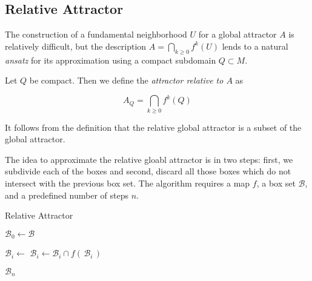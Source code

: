 
\subsection{Relative Attractor}

The construction of a fundamental neighborhood $U$ for a global attractor $A$ is
relatively difficult, but the description $A = \bigcap_{k \geq 0} f^k(U)$ lends to 
a natural \emph{ansatz} for its approximation using a compact subdomain $Q \subset M$. \\

\begin{definition}
    Let $Q$ be compact. Then we define the \emph{attractor relative to $A$} as

    \begin{equation}
        A_Q = \bigcap\limits_{k \geq 0} f^k (Q)
    \end{equation}

\end{definition}

\begin{remark}
    It follows from the definition that the relative global attractor is a subset of the 
    global attractor.\\
\end{remark}

The idea to approximate the relative gloabl attractor is in two steps: first, we subdivide 
each of the boxes and second, discard all those boxes which do not intersect with the 
previous box set. The algorithm requires a map $f$, a box set $\mathcal{B}$, and a 
predefined number of steps $n$. 

\begin{algorithm}
    \caption{Relative Attractor}
    \label{alg:relativeattractor}
    \begin{algorithmic}[1]
        \State $\mathcal{B}_0 \gets \mathcal{B}$

            \State $\mathcal{B}_i \gets$ 
            \State $\mathcal{B}_i \gets \mathcal{B}_i \cap f (\,\mathcal{B}_i\,)$
        \EndFor

        \State \Return $\mathcal{B}_n$ 
    \end{algorithmic}
\end{algorithm}

